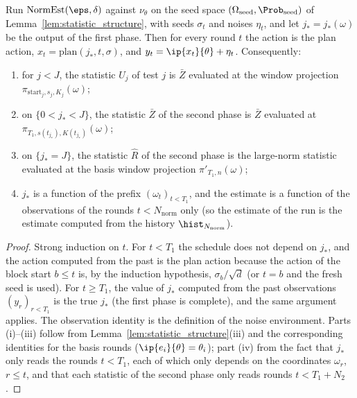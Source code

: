 \begin{lemma}\label{lem:norm_meta_plan}
\leanok
{}
Run $\mathrm{NormEst}(\eps,\delta)$ against $\nu_\theta$ on the seed space
$(\Omega_{\mathrm{seed}}, \Prob_{\mathrm{seed}})$ of Lemma~\ref{lem:statistic_structure}, with
seeds $\sigma_t$ and noises $\eta_t$, and let $j_* = j_*(\omega)$ be the output of the first
phase. Then for every round $t$ the action is the plan action,
$x_t = \mathrm{plan}(j_*, t, \sigma)$, and $y_t = \ip{x_t}{\theta} + \eta_t$. Consequently:
\begin{enumerate}
  \item[(i)] for $j < J$, the statistic $U_j$ of test $j$ is $\bar Z$ evaluated at the window
    projection $\pi_{\mathrm{start}_j, s_j, K_j}(\omega)$;
  \item[(ii)] on $\{0 < j_* < J\}$, the statistic $\bar Z$ of the second phase is $\bar Z$
    evaluated at $\pi_{T_1, s(t_{j_*}), K(t_{j_*})}(\omega)$;
  \item[(iii)] on $\{j_* = J\}$, the statistic $\hat R$ of the second phase is the large-norm
    statistic evaluated at the basis window projection $\pi'_{T_1, n}(\omega)$;
  \item[(iv)] $j_*$ is a function of the prefix $(\omega_t)_{t<T_1}$, and the estimate is a
    function of the observations of the rounds $t < N_{\mathrm{norm}}$ only (so the estimate
    of the run is the estimate computed from the history $\hist_{N_{\mathrm{norm}}}$).
\end{enumerate}
\end{lemma}

\begin{proof}
\leanok
{}
Strong induction on $t$. For $t < T_1$ the schedule does not depend on $j_*$, and the
action computed from the past is the plan action because the action of the block start
$b \le t$ is, by the induction hypothesis, $\sigma_b/\sqrt d$ (or $t = b$ and the fresh seed is
used). For $t \ge T_1$, the value of $j_*$ computed from the past observations
$(y_r)_{r<T_1}$ is the true $j_*$ (the first phase is complete), and the same argument
applies. The observation identity is the definition of the noise environment.
Parts (i)--(iii) follow from Lemma~\ref{lem:statistic_structure}(iii) and the
corresponding identities for the basis rounds ($\ip{e_i}{\theta} = \theta_i$); part (iv) from
the fact that $j_*$ only reads the rounds $t < T_1$, each of which only depends on the
coordinates $\omega_r$, $r \le t$, and that each statistic of the second phase only reads
rounds $t < T_1 + N_2$.
\end{proof}

